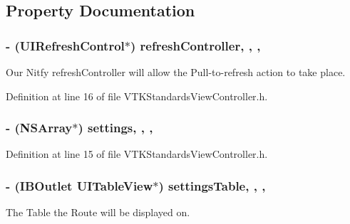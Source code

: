 \subsection{Property Documentation}
\hypertarget{interface_v_t_k_standards_view_controller_ab4a50d1f06688377ca2759fe6833c8da}{
\subsubsection[{refresh\+Controller}]{\setlength{\rightskip}{0pt plus 5cm}-\/ (U\+I\+Refresh\+Control$\ast$) refresh\+Controller\hspace{0.3cm}{\ttfamily [read]}, {\ttfamily [write]}, {\ttfamily [nonatomic]}, {\ttfamily [assign]}}}\label{interface_v_t_k_standards_view_controller_ab4a50d1f06688377ca2759fe6833c8da}
Our Nitfy refresh\+Controller will allow the Pull-\/to-\/refresh action to take place. 

Definition at line 16 of file V\+T\+K\+Standards\+View\+Controller.\+h.

\hypertarget{interface_v_t_k_standards_view_controller_a63a0f419f2bf9408c3c5d4f0b19b667d}{
\subsubsection[{settings}]{\setlength{\rightskip}{0pt plus 5cm}-\/ (N\+S\+Array$\ast$) settings\hspace{0.3cm}{\ttfamily [read]}, {\ttfamily [write]}, {\ttfamily [nonatomic]}, {\ttfamily [assign]}}}\label{interface_v_t_k_standards_view_controller_a63a0f419f2bf9408c3c5d4f0b19b667d}


Definition at line 15 of file V\+T\+K\+Standards\+View\+Controller.\+h.

\hypertarget{interface_v_t_k_standards_view_controller_a80255bab4329e0cc55c67b891340f4e7}{
\subsubsection[{settings\+Table}]{\setlength{\rightskip}{0pt plus 5cm}-\/ (I\+B\+Outlet U\+I\+Table\+View$\ast$) settings\+Table\hspace{0.3cm}{\ttfamily [read]}, {\ttfamily [write]}, {\ttfamily [nonatomic]}, {\ttfamily [weak]}}}\label{interface_v_t_k_standards_view_controller_a80255bab4329e0cc55c67b891340f4e7}
The Table the Route will be displayed on. 

